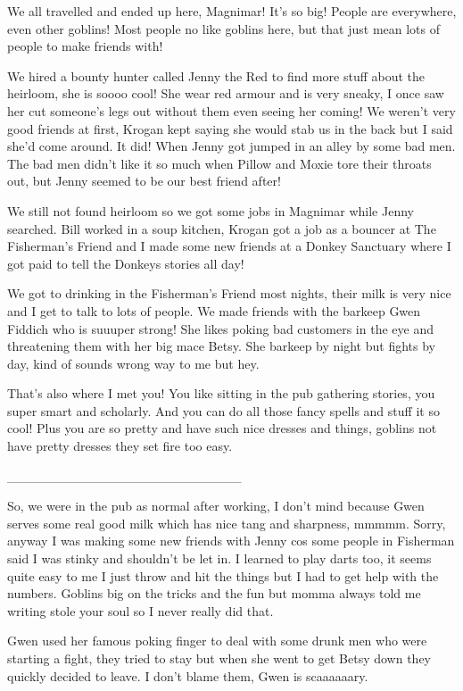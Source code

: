 We all travelled and ended up here, Magnimar! It’s so big! People are everywhere, even other goblins! Most people no like goblins here, but that just mean lots of people to make friends with!\medskip

We hired a bounty hunter called Jenny the Red to find more stuff about the heirloom, she is soooo cool! She wear red armour and is very sneaky, I once saw her cut someone’s legs out without them even seeing her coming! We weren’t very good friends at first, Krogan kept saying she would stab us in the back but I said she’d come around. It did! When Jenny got jumped in an alley by some bad men. The bad men didn’t like it so much when Pillow and Moxie tore their throats out, but Jenny seemed to be our best friend after!\medskip

We still not found heirloom so we got some jobs in Magnimar while Jenny searched. Bill worked in a soup kitchen, Krogan got a job as a bouncer at The Fisherman’s Friend and I made some new friends at a Donkey Sanctuary where I got paid to tell the Donkeys stories all day!\medskip

We got to drinking in the Fisherman’s Friend most nights, their milk is very nice and I get to talk to lots of people. We made friends with the barkeep Gwen Fiddich who is suuuper strong! She likes poking bad customers in the eye and threatening them with her big mace Betsy. She barkeep by night but fights by day, kind of sounds wrong way to me but hey.\medskip

That’s also where I met you! You like sitting in the pub gathering stories, you super smart and scholarly. And you can do all those fancy spells and stuff it so cool! Plus you are so pretty and have such nice dresses and things, goblins not have pretty dresses they set fire too easy.\medskip

\_\_\_\_\_\_\_\_\_\_\_\_\_\_\_\_\_\_\_\_\_\_\_\_\_\medskip

So, we were in the pub as normal after working, I don’t mind because Gwen serves some real good milk which has nice tang and sharpness, mmmmm. Sorry, anyway I was making some new friends with Jenny cos some people in Fisherman said I was stinky and shouldn’t be let in. I learned to play darts too, it seems quite easy to me I just throw and hit the things but I had to get help with the numbers. Goblins big on the tricks and the fun but momma always told me writing stole your soul so I never really did that.\medskip

Gwen used her famous poking finger to deal with some drunk men who were starting a fight, they tried to stay but when she went to get Betsy down they quickly decided to leave. I don’t blame them, Gwen is scaaaaaary.\medskip

